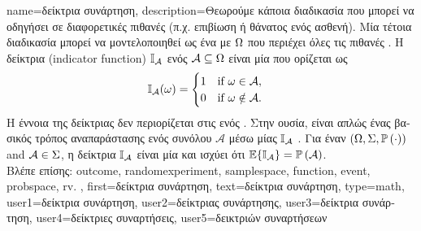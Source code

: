 {name={\foreignlanguage{greek}{δείκτρια συνάρτηση}}, 
	description={\foreignlanguage{greek}{Θεωρούμε κάποια διαδικασία που μπορεί να οδηγήσει σε διαφορετικές 
		πιθανές}  (\foreignlanguage{greek}{π.χ. επιβίωση ή θάνατος 
		ενός ασθενή). Μία τέτοια διαδικασία μπορεί να μοντελοποιηθεί ως ένα}  \foreignlanguage{greek}{με} 
		 $\Omega$ \foreignlanguage{greek}{που περιέχει όλες τις πιθανές} . 
		\foreignlanguage{greek}{Η δείκτρια}  (indicator function) $\mathbb{I}_{\mathcal{A}}$ \foreignlanguage{greek}{ενός} 
		 $\mathcal{A} \subseteq \Omega$ \foreignlanguage{greek}{είναι μία}  
		\foreignlanguage{greek}{που ορίζεται ως} \cite{BertsekasProb} 
		\[
			\mathbb{I}_{\mathcal{A}}(\omega) = 
			\begin{cases}
			1 \quad \text{if } \omega \in \mathcal{A}, \\
			0 \quad \text{if } \omega \notin \mathcal{A}.
			\end{cases}
		\]
		\foreignlanguage{greek}{Η έννοια της δείκτριας}  \foreignlanguage{greek}{δεν περιορίζεται στις}  
		\foreignlanguage{greek}{ενός} . \foreignlanguage{greek}{Στην ουσία, είναι απλώς ένας βασικός τρόπος 
		αναπαράστασης ενός συνόλου $\mathcal{A}$ μέσω μίας}  $\mathbb{I}_{\mathcal{A}}$ \cite{BoydConvexBook}.
		\foreignlanguage{greek}{Για έναν}  $(\Omega, \Sigma, \mathbb{P}\left(\cdot\right))$ and $\mathcal{A} \in \Sigma$, 
		\foreignlanguage{greek}{η δείκτρια}  $\mathbb{I}_{\mathcal{A}}$ \foreignlanguage{greek}{είναι μία}  
		\foreignlanguage{greek}{και ισχύει ότι} $\mathbb{E}\{\mathbb{I}_{\mathcal{A}}\} = \mathbb{P}\left(\mathcal{A}\right)$.
		\\
		\foreignlanguage{greek}{Βλέπε επίσης:} \gls{outcome}, \gls{randomexperiment}, \gls{samplespace}, \gls{function}, \gls{event}, 
		\gls{probspace}, \gls{rv}. }, 
	first={\foreignlanguage{greek}{δείκτρια συνάρτηση}},
	text={\foreignlanguage{greek}{δείκτρια συνάρτηση}},
	type=math,
	user1={\foreignlanguage{greek}{δείκτρια συνάρτηση}}, %
  	user2={\foreignlanguage{greek}{δείκτριας συνάρτησης}}, %
	user3={\foreignlanguage{greek}{δείκτρια συνάρτηση}}, %
	user4={\foreignlanguage{greek}{δείκτριες συναρτήσεις}}, %
  	user5={\foreignlanguage{greek}{δεικτριών συναρτήσεων}} %
}

